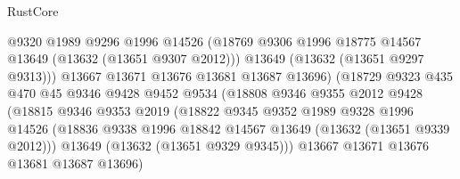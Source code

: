 \begin{lexlean}{RustCore}
\begin{coremodule}
                                  @9320
                                  @1989
                                  @9296
                                  @1996
                                  @14526
                                  (@18769
                                    @9306
                                    @1996
                                    @18775
                                    @14567
                                    @13649
                                    (@13632 (@13651 @9307 @2012)))
                                  @13649
                                  (@13632 (@13651 @9297 @9313)))
                                @13667
                                @13671
                                @13676
                                @13681
                                @13687
                                @13696)
                              (@18729
                                @9323
                                @435
                                @470
                                @45
                                @9346
                                @9428
                                @9452
                                @9534
                                (@18808
                                  @9346
                                  @9355
                                  @2012
                                  @9428
                                  (@18815
                                    @9346
                                    @9353
                                    @2019
                                    (@18822
                                      @9345
                                      @9352
                                      @1989
                                      @9328
                                      @1996
                                      @14526
                                      (@18836
                                        @9338
                                        @1996
                                        @18842
                                        @14567
                                        @13649
                                        (@13632 (@13651 @9339 @2012)))
                                      @13649
                                      (@13632 (@13651 @9329 @9345)))
                                    @13667
                                    @13671
                                    @13676
                                    @13681
                                    @13687
                                    @13696)

\end{coremodule}
\end{lexlean}
